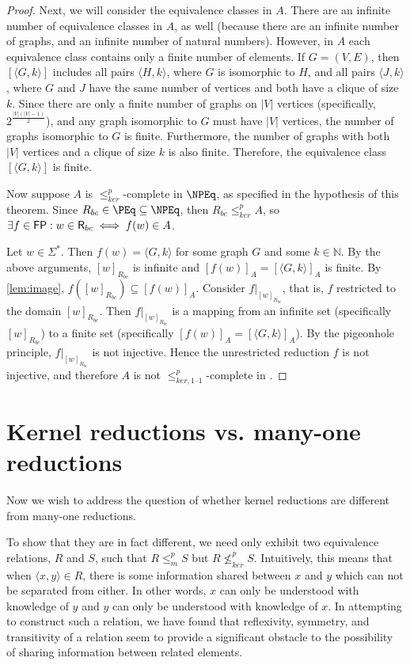 \documentclass{article}
\theoremstyle{definition} \newtheorem{definition}[definition]{Definition}
\newcommand{\sigmastar}{\Sigma^{*}} %
\newcommand{\kr}{\leq^{p}_{ker}} %
\newcommand{\nkr}{\nleq^{p}_{ker}} %
\newcommand{\kri}{\leq^{p}_{ker,1\text{--}1}} %
\newcommand{\mor}{\leq^{p}_{m}} %
\newcommand{\pair}[2]{\langle#1,#2\rangle} %
\begin{document}
\begin{proof}
  Next, we will consider the equivalence classes in $A$. There are an infinite
  number of equivalence classes in $A$, as well (because there are an infinite
  number of graphs, and an infinite number of natural numbers). However, in $A$
  each equivalence class contains only a finite number of elements. If
  $G=(V,E)$, then $[\pair{G}{k}]$ includes all pairs $\pair{H}{k}$, where $G$
  is isomorphic to $H$, and all pairs $\pair{J}{k}$, where $G$ and $J$ have the
  same number of vertices and both have a clique of size $k$. Since there are
  only a finite number of graphs on $|V|$ vertices (specifically,
  $2^\frac{|V|(|V|-1)}{2}$), and any graph isomorphic to $G$ must have $|V|$
  vertices, the number of graphs isomorphic to $G$ is finite. Furthermore, the
  number of graphs with both $|V|$ vertices and a clique of size $k$ is also
  finite. Therefore, the equivalence class $[\pair{G}{k}]$ is finite.

  Now suppose $A$ is $\kr$-complete in $\NPEq$, as specified in the hypothesis
  of this theorem. Since $R_{bc}\in\PEq\subseteq\NPEq$, then $R_{bc}\kr A$, so
  $\exists f\in{\ensuremath{\mathsf{FP}}}: w\in{\ensuremath{\mathsf{R}}}_{bc}\iff f(w)\in A$.

  Let $w\in\sigmastar$. Then $f(w)=\pair{G}{k}$ for some graph $G$ and some
  $k\in\mathbb{N}$. By the above arguments, $[w]_{R_{bc}}$ is infinite and
  $[f(w)]_A=[\pair{G}{k}]_A$ is finite. By \autoref{lem:image},
  $f([w]_{R_{bc}})\subseteq [f(w)]_A$. Consider $f|_{[w]_{R_{bc}}}$, that is,
  $f$ restricted to the domain $[w]_{R_{bc}}$. Then $f|_{[w]_{R_{bc}}}$ is a
  mapping from an infinite set (specifically $[w]_{R_{bc}}$) to a finite set
  (specifically $[f(w)]_A=[\pair{G}{k}]_A$). By the pigeonhole principle,
  $f|_{[w]_{R_{bc}}}$ is not injective. Hence the unrestricted reduction $f$ is
  not injective, and therefore $A$ is not $\kri$-complete in \NPEq.
\end{proof}


\section{Kernel reductions vs. many-one reductions} \label{sec:diffs}

Now we wish to address the question of whether kernel reductions are different
from many-one reductions.

To show that they are in fact different, we need only exhibit two equivalence
relations, $R$ and $S$, such that $R\mor S$ but $R\nkr S$. Intuitively, this
means that when $\pair{x}{y}\in R$, there is some information shared between
$x$ and $y$ which can not be separated from either. In other words, $x$ can
only be understood with knowledge of $y$ and $y$ can only be understood with
knowledge of $x$. In attempting to construct such a relation, we have found
that reflexivity, symmetry, and transitivity of a relation seem to provide a
significant obstacle to the possibility of sharing information between related
elements.
\end{document}
